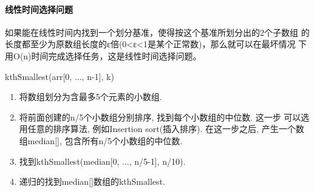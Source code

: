 \paragraph{线性时间选择问题}
如果能在线性时间内找到一个划分基准，使得按这个基准所划分出的2个子数组
的长度都至少为原数组长度的ε倍(0<ε<1是某个正常数)，那么就可以在最坏情况
下用O(n)时间完成选择任务，这是线性时间选择问题。\par
kthSmallest(arr[0, ..., n-1], k)
\begin{enumerate}
	\item 将数组划分为含最多5个元素的小数组.
	\item 将前面创建的n/5个小数组分别排序, 找到每个小数组的中位数. 这一步
	      可以选用任意的排序算法, 例如Insertion sort(插入排序). 在这一步之后,
	      产生一个数组median[], 包含所有n/5个小数组的中位数.
	\item 找到kthSmallest(median[0, ..., n/5-1], n/10).
	\item 递归的找到median[]数组的kthSmallest.
\end{enumerate}

